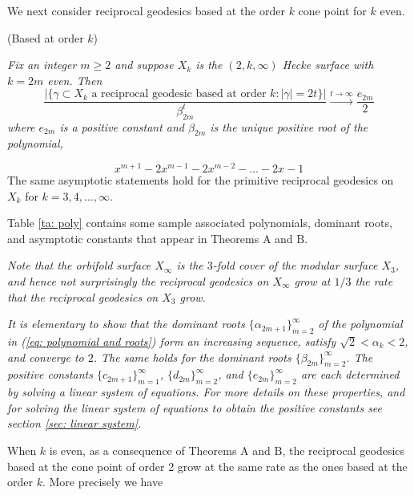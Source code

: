 \documentclass[11pt]{amsart}
\numberwithin{equation}{section}
\theoremstyle{plain}
\newtheorem{thm}{Theorem}[section]
\begin{document}
\vskip5pt

We next consider reciprocal geodesics based at the order $k$ cone point for $k$ even. 

\vskip5pt

 (Based at order $k$)
{\it Fix an integer $m \geq2$ and suppose   
$X_{k}$ is the $(2,k,\infty)$ Hecke surface with $k=2m$  even. Then
\begin{displaymath}
\frac{\big|\{\gamma \subset X_{k} \text{ a reciprocal geodesic based at order 
$k$}: |\gamma|=2t\}\big|}
{\beta_{2m}^{t}} \xrightarrow{t\to\infty} \frac{e_{2m}}{2}
\end{displaymath}
where $e_{2m}$ is a positive constant and $\beta_{2m}$ is the unique positive root of the polynomial,

\begin{equation*}
  x^{m+1} -2x^{m-1} -2x^{m-2}- \dots -2x-1   
\end{equation*}
The same asymptotic statements hold for the primitive reciprocal geodesics on $X_{k}$ for $k=3,4,...,\infty$.}

Table \ref{ta: poly} contains some sample    associated polynomials, dominant roots, and asymptotic constants that appear in   Theorems  $\text{A}$  and $\text{B}$.
\vskip5pt

{\it Note that the orbifold surface $X_{\infty}$ is the $3$-fold cover of the modular surface $X_3$, and hence not surprisingly the reciprocal geodesics on $X_{\infty}$ grow at $1/3$ the rate that the reciprocal geodesics on $X_3$ grow.}  


\vskip5pt

{\it It is elementary to show that   the dominant roots   $\{\alpha_{2m+1}\}_{m=2}^{\infty}$  of the polynomial in (\ref{eq: polynomial and roots})  form an 
 increasing sequence, satisfy $\sqrt{2}< \alpha_{k}< 2$, and converge to $2$. The same holds  for  the dominant roots $\{\beta_{2m}\}_{m=2}^{\infty}$. The positive constants 
 $\{c_{2m+1}\}_{m=1}^{\infty}$,
$\{d_{2m}\}_{m=2}^{\infty}$, and $\{e_{2m}\}_{m=2}^{\infty}$ are each determined by solving a linear system of equations. 
 For more details  on these  properties, and for solving the linear system of equations  to obtain the positive constants  see section \ref{sec: linear system}.}

 
 When $k$ is even, as a consequence of Theorems 
 $\text{A}$ and $\text{B}$,
 the  reciprocal geodesics based at the cone point of order 2 grow at the same rate as the ones based at the  order $k$.
 More precisely we have
 
\end{document}
